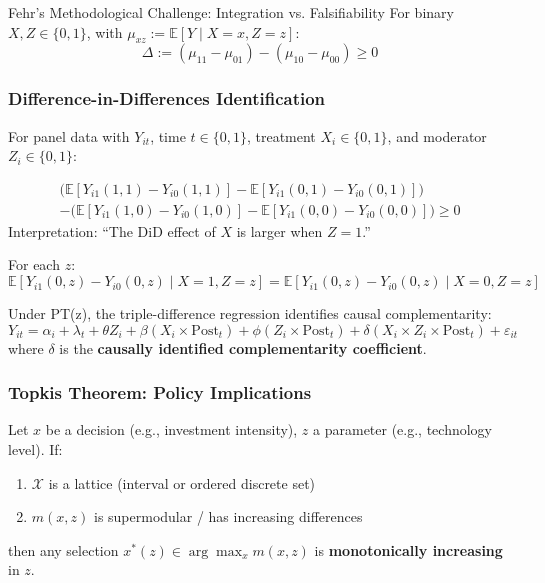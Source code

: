 \begin{chapter}{Fehr's Methodological Challenge: Integration vs. Falsifiability}
For binary $X, Z \in \{0,1\}$, with $\mu_{xz} := \mathbb{E}[Y \mid X=x, Z=z]$:
\begin{equation}
\boxed{\Delta := (\mu_{11} - \mu_{01}) - (\mu_{10} - \mu_{00}) \geq 0}
\end{equation}

\subsubsection{Difference-in-Differences Identification}

For panel data with $Y_{it}$, time $t \in \{0,1\}$, treatment $X_i \in \{0,1\}$, and moderator $Z_i \in \{0,1\}$:

\begin{definition}
\label{def:did-complementarity}
\begin{multline}
\Big(\mathbb{E}[Y_{i1}(1,1) - Y_{i0}(1,1)] - \mathbb{E}[Y_{i1}(0,1) - Y_{i0}(0,1)]\Big) \\
- \Big(\mathbb{E}[Y_{i1}(1,0) - Y_{i0}(1,0)] - \mathbb{E}[Y_{i1}(0,0) - Y_{i0}(0,0)]\Big) \geq 0
\tag{DiD-ID}
\end{multline}
Interpretation: ``The DiD effect of $X$ is larger when $Z=1$.''
\end{definition}

\begin{assumption}
\label{ass:parallel-trends}
For each $z$:
\begin{equation}
\mathbb{E}[Y_{i1}(0,z) - Y_{i0}(0,z) \mid X=1, Z=z] = \mathbb{E}[Y_{i1}(0,z) - Y_{i0}(0,z) \mid X=0, Z=z]
\tag{PT(z)}
\end{equation}
\end{assumption}

Under PT(z), the triple-difference regression identifies causal complementarity:
\begin{equation}
Y_{it} = \alpha_i + \lambda_t + \theta Z_i + \beta (X_i \times \text{Post}_t) + \phi (Z_i \times \text{Post}_t) + \delta (X_i \times Z_i \times \text{Post}_t) + \varepsilon_{it}
\end{equation}
where $\delta$ is the \textbf{causally identified complementarity coefficient}.

\subsubsection{Topkis Theorem: Policy Implications}

\begin{theorem}
\label{thm:topkis}
Let $x$ be a decision (e.g., investment intensity), $z$ a parameter (e.g., technology level).
If:
\begin{enumerate}[noitemsep]
    \item $\mathcal{X}$ is a lattice (interval or ordered discrete set)
    \item $m(x,z)$ is supermodular / has increasing differences
\end{enumerate}
then any selection $x^*(z) \in \arg\max_x m(x,z)$ is \textbf{monotonically increasing} in $z$.
\end{theorem}


\end{chapter}
